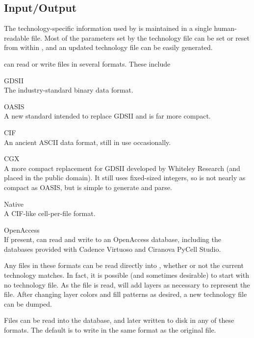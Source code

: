 \subsection{Input/Output}

The technology-specific information used by {\Xic} is maintained in a
single human-readable file.  Most of the parameters set by the
technology file can be set or reset from within {\Xic}, and an updated
technology file can be easily generated.

{\Xic} can read or write files in several formats.  These include

\begin{description}
\item{GDSII}\\
The industry-standard binary data format.

\item{OASIS}\\
A new standard intended to replace GDSII and is far more
compact.

\item{CIF}\\
An ancient ASCII data format, still in use occasionally.

\item{CGX}\\
A more compact replacement for GDSII developed by Whiteley Research
(and placed in the public domain).  It still uses fixed-sized
integers, so is not nearly as compact as OASIS, but is simple to
generate and parse.

\item{Native}\\
A CIF-like cell-per-file format.

\ifoa
\item{OpenAccess}\\
If present, {\Xic} can read and write to an OpenAccess database,
including the databases provided with Cadence Virtuoso and Ciranova
PyCell Studio.
\fi
\end{description}

Any files in these formats can be read directly into {\Xic}, whether
or not the current technology matches.  In fact, it is possible (and
sometimes desirable) to start {\Xic} with no technology file.  As the
file is read, {\Xic} will add layers as necessary to represent the
file.  After changing layer colors and fill patterns as desired, a new
technology file can be dumped.

Files can be read into the {\Xic} database, and later written to disk
in any of these formats.  The default is to write in the same format
as the original file.

